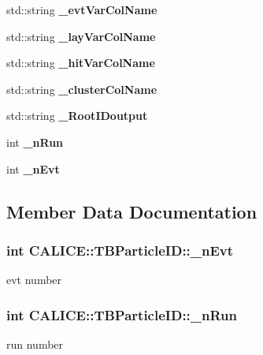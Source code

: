 \begin{DoxyCompactItemize}
\item 
std\-::string {\bfseries \-\_\-evt\-Var\-Col\-Name}\label{classCALICE_1_1TBParticleID_a24baf1f9bcee0a543a35b3b66d6a82f9}

\item 
std\-::string {\bfseries \-\_\-lay\-Var\-Col\-Name}\label{classCALICE_1_1TBParticleID_a62f7cb4a834cbec136fe26c053669e2a}

\item 
std\-::string {\bfseries \-\_\-hit\-Var\-Col\-Name}\label{classCALICE_1_1TBParticleID_ac1f67149bdcf3e8330f626cf508a51d1}

\item 
std\-::string {\bfseries \-\_\-cluster\-Col\-Name}\label{classCALICE_1_1TBParticleID_a3fd9389aa932f52000237e38e0e1f855}

\item 
std\-::string {\bfseries \-\_\-\-Root\-I\-Doutput}\label{classCALICE_1_1TBParticleID_a81fbeeab06a1266229a9654c062db932}

\item 
int {\bf \-\_\-n\-Run}
\item 
int {\bf \-\_\-n\-Evt}
\end{DoxyCompactItemize}


\subsection{Member Data Documentation}
\subsubsection[{\-\_\-n\-Evt}]{\setlength{\rightskip}{0pt plus 5cm}int C\-A\-L\-I\-C\-E\-::\-T\-B\-Particle\-I\-D\-::\-\_\-n\-Evt\hspace{0.3cm}{\ttfamily [protected]}}\label{classCALICE_1_1TBParticleID_aab1a2df5b674ce9275b7b1795ae44ff9}
evt number 
\subsubsection[{\-\_\-n\-Run}]{\setlength{\rightskip}{0pt plus 5cm}int C\-A\-L\-I\-C\-E\-::\-T\-B\-Particle\-I\-D\-::\-\_\-n\-Run\hspace{0.3cm}{\ttfamily [protected]}}\label{classCALICE_1_1TBParticleID_af5b2b90755cb13d10a7307452c3899c4}
run number 

